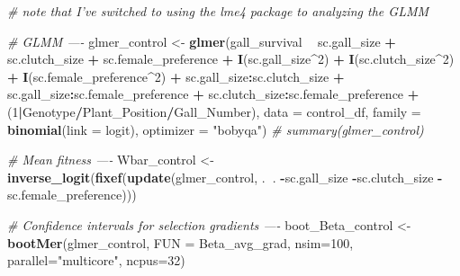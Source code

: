 \documentclass[]{elsarticle} %
\newenvironment{Shaded}{\begin{snugshade}}{\end{snugshade}}
\newcommand{\KeywordTok}[1]{\textcolor[rgb]{0.13,0.29,0.53}{\textbf{#1}}}
\newcommand{\DataTypeTok}[1]{\textcolor[rgb]{0.13,0.29,0.53}{#1}}
\newcommand{\DecValTok}[1]{\textcolor[rgb]{0.00,0.00,0.81}{#1}}
\newcommand{\StringTok}[1]{\textcolor[rgb]{0.31,0.60,0.02}{#1}}
\newcommand{\CommentTok}[1]{\textcolor[rgb]{0.56,0.35,0.01}{\textit{#1}}}
\newcommand{\OperatorTok}[1]{\textcolor[rgb]{0.81,0.36,0.00}{\textbf{#1}}}
\newcommand{\NormalTok}[1]{#1}
\begin{document}
\begin{Shaded}
\begin{Highlighting}[]
\CommentTok{# note that I've switched to using the lme4 package to analyzing the GLMM}

\CommentTok{# GLMM ----}
\NormalTok{glmer_control <-}\StringTok{ }\KeywordTok{glmer}\NormalTok{(gall_survival }\OperatorTok{~}\StringTok{ }\NormalTok{sc.gall_size }\OperatorTok{+}\StringTok{ }\NormalTok{sc.clutch_size }\OperatorTok{+}\StringTok{ }\NormalTok{sc.female_preference }\OperatorTok{+}
\StringTok{                         }\KeywordTok{I}\NormalTok{(sc.gall_size}\OperatorTok{^}\DecValTok{2}\NormalTok{) }\OperatorTok{+}\StringTok{ }\KeywordTok{I}\NormalTok{(sc.clutch_size}\OperatorTok{^}\DecValTok{2}\NormalTok{) }\OperatorTok{+}\StringTok{ }\KeywordTok{I}\NormalTok{(sc.female_preference}\OperatorTok{^}\DecValTok{2}\NormalTok{) }\OperatorTok{+}
\StringTok{                         }\NormalTok{sc.gall_size}\OperatorTok{:}\NormalTok{sc.clutch_size }\OperatorTok{+}\StringTok{ }\NormalTok{sc.gall_size}\OperatorTok{:}\NormalTok{sc.female_preference }\OperatorTok{+}\StringTok{ }\NormalTok{sc.clutch_size}\OperatorTok{:}\NormalTok{sc.female_preference }\OperatorTok{+}
\StringTok{                           }\NormalTok{(}\DecValTok{1}\OperatorTok{|}\NormalTok{Genotype}\OperatorTok{/}\NormalTok{Plant_Position}\OperatorTok{/}\NormalTok{Gall_Number),}
                         \DataTypeTok{data =}\NormalTok{ control_df,}
                         \DataTypeTok{family =} \KeywordTok{binomial}\NormalTok{(}\DataTypeTok{link =}\NormalTok{ logit), }\DataTypeTok{optimizer =} \StringTok{"bobyqa"}\NormalTok{)}
\CommentTok{# summary(glmer_control)}

\CommentTok{# Mean fitness ----}
\NormalTok{Wbar_control <-}\StringTok{ }\KeywordTok{inverse_logit}\NormalTok{(}\KeywordTok{fixef}\NormalTok{(}\KeywordTok{update}\NormalTok{(glmer_control, .}\OperatorTok{~}\NormalTok{. }\OperatorTok{-}\NormalTok{sc.gall_size }\OperatorTok{-}\NormalTok{sc.clutch_size }\OperatorTok{-}\NormalTok{sc.female_preference)))}

\CommentTok{# Confidence intervals for selection gradients ----}
\NormalTok{boot_Beta_control <-}\StringTok{ }\KeywordTok{bootMer}\NormalTok{(glmer_control, }\DataTypeTok{FUN =}\NormalTok{ Beta_avg_grad, }\DataTypeTok{nsim=}\DecValTok{100}\NormalTok{, }\DataTypeTok{parallel=}\StringTok{"multicore"}\NormalTok{, }\DataTypeTok{ncpus=}\DecValTok{32}\NormalTok{)}


\end{Highlighting}
\end{Shaded}
\end{document}
